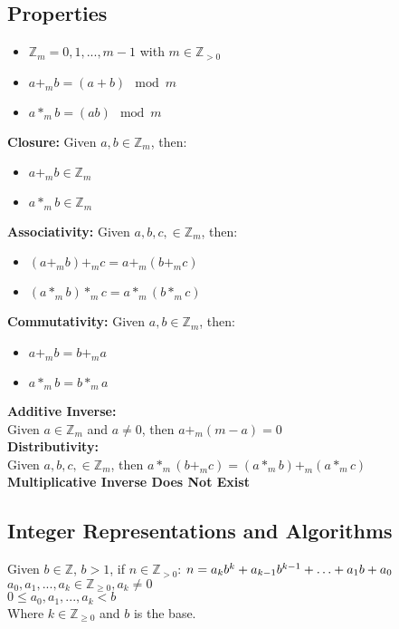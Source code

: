 \documentclass[letter]{article}
\begin{document}
\begin{multicols}{2}
  \subsection{Properties} 
  \begin{itemize} 
	  \item $\mathbb{Z}_m = {0, 1, ..., m- 1}$ with $ m\in \mathbb{Z}_{>0}$
	  \item $a+_mb = (a + b)\mod m$
	  \item $a*_mb = (ab)\mod m$
  \end{itemize}
  \textbf{Closure:} Given $a, b \in \mathbb{Z}_m$, then:
  \begin{itemize} 
	  \item $a+_mb \in \mathbb{Z}_m$
	  \item $a*_mb \in \mathbb{Z}_m$
  \end{itemize}
  \textbf{Associativity:} Given $a, b, c, \in \mathbb{Z}_m$, then:
  \begin{itemize} 
  	\item $(a +_mb)+_mc = a+_m(b+_mc)$
	\item $(a *_mb)*_mc = a*_m(b*_mc)$
  \end{itemize}
  \textbf{Commutativity:} Given $a, b \in \mathbb{Z}_m$, then:
  \begin{itemize} 
	  \item $a+_mb = b+_ma$
	  \item $a*_mb = b*_ma$
  \end{itemize}
  \textbf{Additive Inverse:}\\ Given $a \in \mathbb{Z}_m$ and $a \neq 0$, then
  $a+_m(m - a) = 0$ \\
  \textbf{Distributivity:}\\ Given $a, b, c, \in \mathbb{Z}_m$, then
  $a*_m(b+_mc) = (a*_mb) +_m (a*_mc)$ \\
  \textbf{Multiplicative Inverse Does Not Exist}

  \subsection{Integer Representations and Algorithms} 
  Given $b \in \mathbb{Z}$, $b > 1$, if $n \in \mathbb{Z}_{>0}$: $\\n = a_kb^k +
  a_{k-1}b^{k-1} + \ldots + a_1b + a_0$\\
  $ a_0, a_1, ..., a_k \in \mathbb{Z}_{\geq 0}, a_k \neq 0$\\
  $0 \leq a_0, a_1, ..., a_k < b$\\
   Where $k \in \mathbb{Z}_{\geq 0}$ and $b$ is the base.


\end{multicols}
\end{document}
